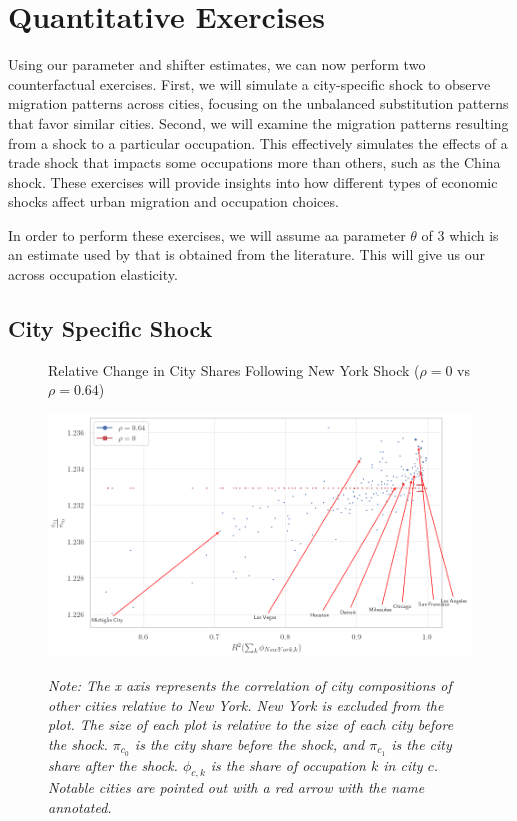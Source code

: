 \documentclass[10pt]{article}
\begin{document}
\section{Quantitative Exercises}

Using our parameter and shifter estimates, we can now perform two counterfactual exercises. First, we will simulate a city-specific shock to observe migration patterns across cities, focusing on the unbalanced substitution patterns that favor similar cities. Second, we will examine the migration patterns resulting from a shock to a particular occupation. This effectively simulates the effects of a trade shock that impacts some occupations more than others, such as the China shock. These exercises will provide insights into how different types of economic shocks affect urban migration and occupation choices.

In order to perform these exercises, we will assume aa parameter $\theta$ of 3 which is an estimate used by \cite{redding} that is obtained from the literature. This will give us our across occupation elasticity.

\subsection{City Specific Shock}

\begin{figure}[!htb]
    \centering
    \caption{Relative Change in City Shares Following New York Shock ($\rho = 0$ vs $\rho = 0.64$)}
    \includegraphics[width=\textwidth]{../../estimations/graphs/city_shock.png}
    \label{ny_change_graph}
    \caption*{\small\textit{Note: The x axis represents the correlation of city compositions of other cities relative to New York. New York is excluded from the plot. The size of each plot is relative to the size of each city before the shock. $\pi_{c_0}$ is the city share before the shock, and $\pi_{c_1}$ is the city share after the shock. $\phi_{c, k}$ is the share of occupation $k$ in city $c$. Notable cities are pointed out with a red arrow with the name annotated.}}
\end{figure}
\end{document}

